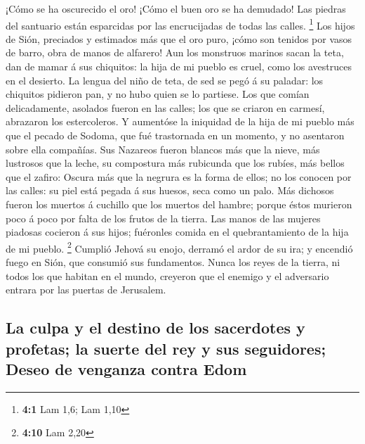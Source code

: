  ¡Cómo se ha oscurecido el oro! ¡Cómo el buen oro se ha
demudado! Las piedras del santuario están esparcidas por las
encrucijadas de todas las calles. \footnote{\textbf{4:1} Lam 1,6; Lam
  1,10}  Los hijos de Sión, preciados y estimados más que
el oro puro, ¡cómo son tenidos por vasos de barro, obra de manos de
alfarero!  Aun los monstruos marinos sacan la teta, dan de
mamar á sus chiquitos: la hija de mi pueblo es cruel, como los
avestruces en el desierto.  La lengua del niño de teta, de
sed se pegó á su paladar: los chiquitos pidieron pan, y no hubo quien se
lo partiese.  Los que comían delicadamente, asolados
fueron en las calles; los que se criaron en carmesí, abrazaron los
estercoleros.  Y aumentóse la iniquidad de la hija de mi
pueblo más que el pecado de Sodoma, que fué trastornada en un momento, y
no asentaron sobre ella compañías.  Sus Nazareos fueron
blancos más que la nieve, más lustrosos que la leche, su compostura más
rubicunda que los rubíes, más bellos que el zafiro: 
Oscura más que la negrura es la forma de ellos; no los conocen por las
calles: su piel está pegada á sus huesos, seca como un palo.
 Más dichosos fueron los muertos á cuchillo que los
muertos del hambre; porque éstos murieron poco á poco por falta de los
frutos de la tierra.  Las manos de las mujeres piadosas
cocieron á sus hijos; fuéronles comida en el quebrantamiento de la hija
de mi pueblo. \footnote{\textbf{4:10} Lam 2,20}  Cumplió
Jehová su enojo, derramó el ardor de su ira; y encendió fuego en Sión,
que consumió sus fundamentos.  Nunca los reyes de la
tierra, ni todos los que habitan en el mundo, creyeron que el enemigo y
el adversario entrara por las puertas de Jerusalem.

\hypertarget{la-culpa-y-el-destino-de-los-sacerdotes-y-profetas-la-suerte-del-rey-y-sus-seguidores-deseo-de-venganza-contra-edom}{%
\subsection{La culpa y el destino de los sacerdotes y profetas; la
suerte del rey y sus seguidores; Deseo de venganza contra
Edom}\label{la-culpa-y-el-destino-de-los-sacerdotes-y-profetas-la-suerte-del-rey-y-sus-seguidores-deseo-de-venganza-contra-edom}}

